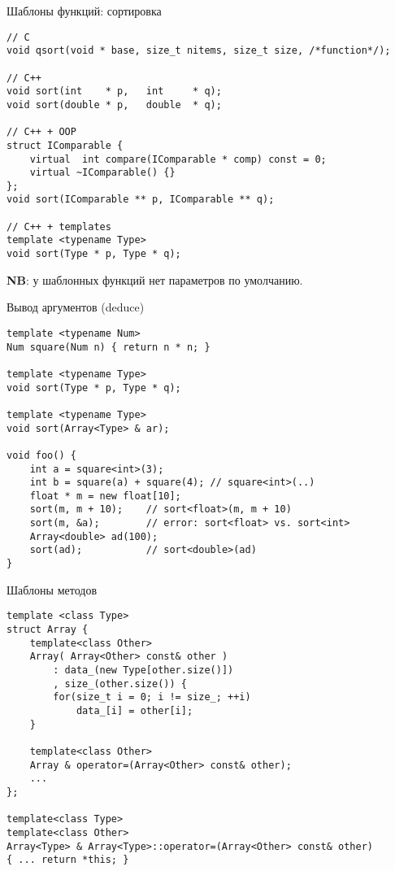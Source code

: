 \documentclass{beamer}
\begin{document}
\begin{frame}[fragile]{Шаблоны функций: сортировка}
\small
    \begin{lstlisting}
// C
void qsort(void * base, size_t nitems, size_t size, /*function*/);

// C++
void sort(int    * p,   int     * q);
void sort(double * p,   double  * q);

// C++ + OOP
struct IComparable {
    virtual  int compare(IComparable * comp) const = 0;
    virtual ~IComparable() {}
};
void sort(IComparable ** p, IComparable ** q);

// C++ + templates
template <typename Type>
void sort(Type * p, Type * q);
    \end{lstlisting}
{\bf NB}: у шаблонных функций нет параметров по умолчанию.
\end{frame}

\begin{frame}[fragile]{Вывод аргументов (deduce)}
\small
    \begin{lstlisting}
template <typename Num>
Num square(Num n) { return n * n; }

template <typename Type>
void sort(Type * p, Type * q);

template <typename Type>
void sort(Array<Type> & ar); 

void foo() {
    int a = square<int>(3);
    int b = square(a) + square(4); // square<int>(..)
    float * m = new float[10];
    sort(m, m + 10);    // sort<float>(m, m + 10)
    sort(m, &a);        // error: sort<float> vs. sort<int>
    Array<double> ad(100);
    sort(ad);           // sort<double>(ad)
}
    \end{lstlisting}
\end{frame}

\begin{frame}[fragile]{Шаблоны методов}
\small
    \begin{lstlisting}
template <class Type> 
struct Array {
    template<class Other>
    Array( Array<Other> const& other )
        : data_(new Type[other.size()])
        , size_(other.size()) {
        for(size_t i = 0; i != size_; ++i)
            data_[i] = other[i];
    }

    template<class Other>
    Array & operator=(Array<Other> const& other);
    ...
};

template<class Type>
template<class Other>
Array<Type> & Array<Type>::operator=(Array<Other> const& other)
{ ... return *this; }
    \end{lstlisting}
\end{frame}
\end{document}
